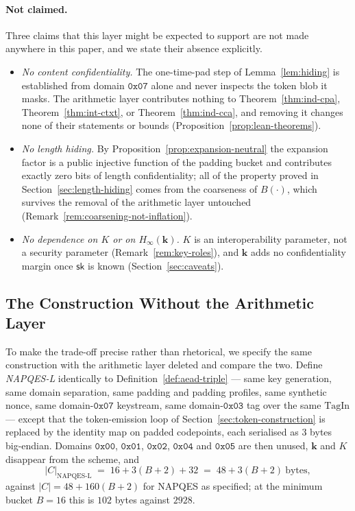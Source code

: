 \documentclass[11pt,a4paper]{article}
\begin{document}
\paragraph{Not claimed.}
Three claims that this layer might be expected to support are not made
anywhere in this paper, and we state their absence explicitly.
\begin{itemize}
  \item \emph{No content confidentiality.} The one-time-pad step of
        Lemma~\ref{lem:hiding} is established from domain $\texttt{0x07}$
        alone and never inspects the token blob it masks. The arithmetic
        layer contributes nothing to Theorem~\ref{thm:ind-cpa},
        Theorem~\ref{thm:int-ctxt}, or Theorem~\ref{thm:ind-cca}, and
        removing it changes none of their statements or bounds
        (Proposition~\ref{prop:lean-theorems}).
  \item \emph{No length hiding.} By
        Proposition~\ref{prop:expansion-neutral} the expansion factor is a
        public injective function of the padding bucket and contributes
        exactly zero bits of length confidentiality; all of the property
        proved in Section~\ref{sec:length-hiding} comes from the coarseness
        of $B(\cdot)$, which survives the removal of the arithmetic layer
        untouched (Remark~\ref{rem:coarsening-not-inflation}).
  \item \emph{No dependence on $K$ or on $H_\infty(\mathbf{k})$.} $K$ is an
        interoperability parameter, not a security parameter
        (Remark~\ref{rem:key-roles}), and $\mathbf{k}$ adds no
        confidentiality margin once $\mathsf{sk}$ is known
        (Section~\ref{sec:caveats}).
\end{itemize}

\subsection{The Construction Without the Arithmetic Layer}
\label{sec:lean-profile}

To make the trade-off precise rather than rhetorical, we specify the same
construction with the arithmetic layer deleted and compare the two. Define
\emph{NAPQES-L} identically to Definition~\ref{def:aead-triple} — same key
generation, same domain separation, same padding and padding profiles, same
synthetic nonce, same domain-$\texttt{0x07}$ keystream, same
domain-$\texttt{0x03}$ tag over the same $\mathrm{TagIn}$ — except that the
token-emission loop of Section~\ref{sec:token-construction} is replaced by
the identity map on padded codepoints, each serialised as $3$ bytes
big-endian. Domains $\texttt{0x00}$, $\texttt{0x01}$, $\texttt{0x02}$,
$\texttt{0x04}$ and $\texttt{0x05}$ are then unused, $\mathbf{k}$ and $K$
disappear from the scheme, and
\[
  |C|_{\text{NAPQES-L}} \;=\; 16 + 3(B+2) + 32 \;=\; 48+3(B+2)\ \text{bytes},
\]
against $|C| = 48+160(B+2)$ for NAPQES as specified; at the minimum bucket
$B=16$ this is $102$ bytes against $2928$.
\end{document}
